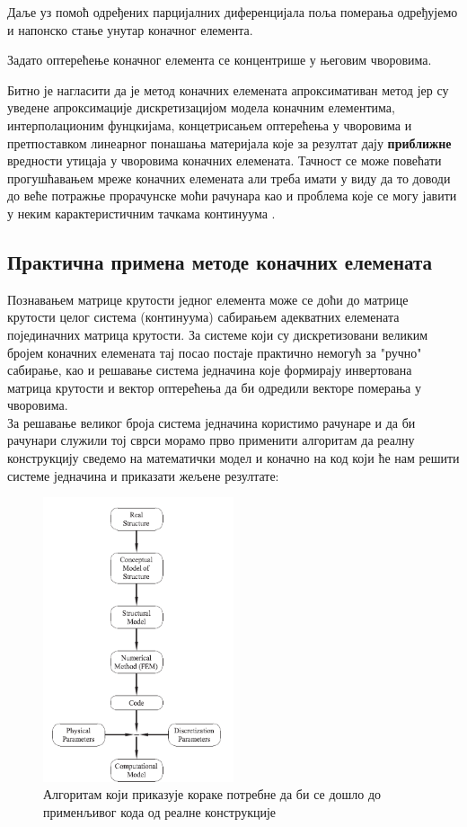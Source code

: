 \documentclass[11pt, a4paper]{article}
\begin{document}
Даље уз помоћ одређених парцијалних диференцијала поља померања одређујемо и  напонско стање унутар коначног елемента.
\par
Задато оптерећење коначног елемента се концентрише у његовим чворовима.
\par 
Битно је нагласити да је метод коначних елемената апроксимативан метод јер су уведене апроксимације дискретизацијом модела коначним елементима, интерполационим фунцкијама, концетрисањем оптерећења у чворовима и претпоставком линеарног понашања материјала које за резултат дају \textbf{приближне} вредности утицаја у чворовима коначних елемената. Тачност се може повећати прогушћавањем мреже коначних елемената али треба имати у виду да то доводи до веће потражње прорачунске моћи рачунара као и проблема које се могу јавити у неким карактеристичним тачкама континуума \cite{eo1}.
\subsection{Практична примена методе коначних елемената}
Познавањем матрице крутости једног елемента може се доћи до матрице крутости целог система (континуума) сабирањем адекватних елемената појединачних матрица крутости. За системе који су дискретизовани великим бројем коначних елемената тај посао постаје практично немогућ за "ручно" сабирање, као и решавање система једначина које формирају инвертована матрица крутости и вектор оптерећења да би одредили векторе померања у чворовима.\\
За решавање великог броја система једначина користимо рачунаре и да би рачунари служили тој сврси морамо прво применити алгоритам да реалну конструкцију сведемо на математички модел и коначно на код који ће нам решити системе једначина и приказати жељене резултате:
\begin{figure}[H]
\includegraphics[width=0.5\textwidth,center]{Slike/Algoritam.png}
\caption{Алгоритам који приказује кораке потребне да би се дошло до применљивог кода од реалне конструкције \cite{eo1}}
\end{figure}
\end{document}
